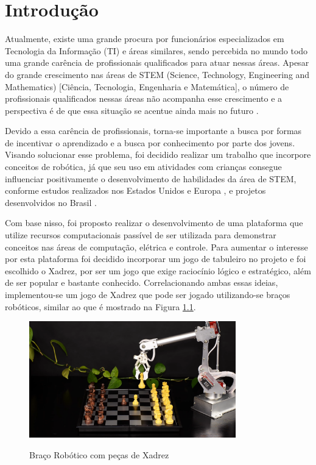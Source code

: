 \chapter[Introdução]{Introdução}
\label{cap:introducao}

Atualmente, existe uma grande procura por funcionários especializados em Tecnologia da Informação (TI) e áreas similares, sendo percebida no mundo todo uma grande carência de profissionais qualificados para atuar nessas áreas.
Apesar do grande crescimento nas áreas de STEM (Science, Technology, Engineering and Mathematics) [Ciência, Tecnologia, Engenharia e Matemática], o número de profissionais qualificados nessas áreas não acompanha esse crescimento e a perspectiva é de que essa situação se acentue ainda mais no futuro \cite{shortage_of_workers}.

Devido a essa carência de profissionais, torna-se importante a busca por formas de incentivar o aprendizado e a busca por conhecimento por parte dos jovens.
Visando solucionar esse problema, foi decidido realizar um trabalho que incorpore conceitos de robótica, já que seu uso em atividades com crianças consegue influenciar positivamente o desenvolvimento de habilidades da área de STEM, conforme estudos realizados nos Estados Unidos e Europa \cite{technology_for_stem}, e projetos desenvolvidos no Brasil \cite{robotica_educacao}.

Com base nisso, foi proposto realizar o desenvolvimento de uma plataforma que utilize recursos computacionais passível de ser utilizada para demonstrar conceitos nas áreas de computação, elétrica e controle.
Para aumentar o interesse por esta plataforma foi decidido incorporar um jogo de tabuleiro no projeto e foi escolhido o Xadrez, por ser um jogo que exige raciocínio lógico e estratégico, além de ser popular e bastante conhecido.
Correlacionando ambas essas ideias, implementou-se um jogo de Xadrez que pode ser jogado utilizando-se braços robóticos, similar ao que é mostrado na Figura \ref{fig:bracoRoboticoXadrez}.

\begin{figure}[H]
    \centering
    \caption{Braço Robótico com peças de Xadrez}
    \includegraphics[keepaspectratio=true, width=0.8\textwidth]
    	{img/robotic-arm-chess-example.png}
    \label{fig:bracoRoboticoXadrez}
\end{figure}

